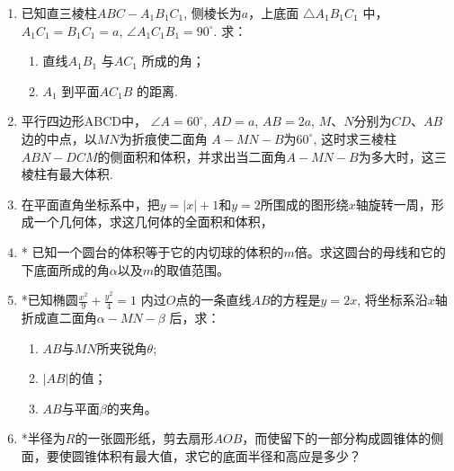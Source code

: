 \begin{enumerate}
\item 已知直三棱柱$ABC-A_{1}B_{1}C_{1}$, 侧棱长为$a$，上底面 $\triangle A_{1}  B_{1}C_{1}$ 中， $A_{1}C_{1}=B_{1}C_{1}=a$,  $\angle A_{1}C_{1}B_{1}=90^{\circ}$. 求：
\begin{enumerate}[(1)]
    \item 直线$A_{1}B_{1}$ 与$AC_{1}$ 所成的角；
    \item $A_{1}$ 到平面$AC_{1}B$ 的距离.
\end{enumerate}

\item 平行四边形ABCD中， $\angle A=60^{\circ}$, $ AD=a$,  $AB=2a$,  $M$、$N$分别为$CD$、$AB$边的中点，以$MN$为折痕使二面角 $A-MN-B$为$60^{\circ}$, 这时求三棱柱$ ABN-DCM $的侧面积和体积，并求出当二面角$ A-MN-B $为多大时，这三棱柱有最大体积.

\item 在平面直角坐标系中，把$y=|x|+1 $和$ y=2 $所围成的图形绕$x$轴旋转一周，形成一个几何体，求这几何体的全面积和体积，

\item *
已知一个圆台的体积等于它的内切球的体积的$m$倍。求这圆台的母线和它的下底面所成的角$\alpha$以及$m$的取值范围。

\item *已知椭圆$\frac{x^{2}}{9}+\frac{y^{2}}{4}=1$ 内过$O$点的一条直线$AB$的方程是$y=2x$, 将坐标系沿$x$轴折成直二面角$\alpha-MN-\beta$ 后，求：
\begin{enumerate}[(1)]
\item $AB$与$MN$所夹锐角$\theta$;
        \item $|AB| $的值；
            \item $AB$与平面$\beta$的夹角。
\end{enumerate}
    

\item *半径为$R$的一张圆形纸，剪去扇形$AOB$，而使留下的一部分构成圆锥体的侧面，要使圆锥体积有最大值，求它的底面半径和高应是多少？
\end{enumerate}































